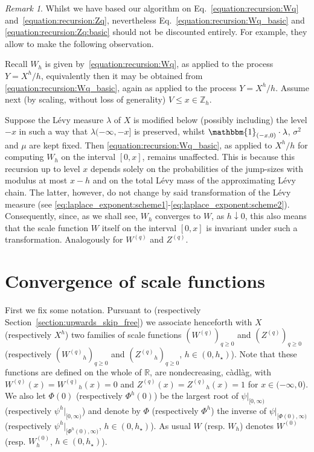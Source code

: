 \documentclass[pdftex,oneside,11pt,reqno]{amsart}
\theoremstyle{definition}
\theoremstyle{theorem}
\theoremstyle{remark}
\newtheorem{remark}{Remark}[section]
\numberwithin{equation}{section}
\numberwithin{definition}{section}
\begin{document}
\begin{remark}\label{remark:numerics:three} 
Whilst we have based our algorithm on Eq.~\eqref{equation:recursion:Wq} and~\eqref{equation:recursion:Zq}, nevertheless Eq.~\eqref{equation:recursion:Wq_basic} and \eqref{equation:recursion:Zq:basic} should not be discounted entirely. For example, they allow 
to make the following observation. 

Recall ${W}_h$ is given by~\eqref{equation:recursion:Wq}, as applied to the process $Y=X^h/h$, equivalently then it may be obtained from \eqref{equation:recursion:Wq_basic}, again as applied to the process $Y=X^h/h$. Assume next (by scaling, without loss of generality) $V\leq x\in {\mathbb{Z}_h}$. 

Suppose the L\'evy measure ${\lambda}$ of $X$ is modified below (possibly including) the level $-x$ in such a way that ${\lambda}(-\infty,-x]$ is preserved, whilst $ \mathbbm{1}_{(-x,0)}\cdot{\lambda}$, ${\sigma^2}$ and $\mu$ are kept fixed. Then \eqref{equation:recursion:Wq_basic}, as applied to $X^h/h$ for computing $W_h$ on the interval $[0,x]$, remains unaffected. This is because this recursion up to level $x$ depends solely on the probabilities of the jump-sizes with modulus at most $x-h$  and on the total L\'evy mass of the approximating L\'evy chain. The latter, however, do not change by said transformation of the L\'evy measure (see \eqref{eq:laplace_exponent:scheme1}-\eqref{eq:laplace_exponent:scheme2}). Consequently, since, as we shall see, ${W}_h$ converges to ${W}$, as $h\downarrow 0$, this also means that  the scale function ${W}$ itself on the interval $[0,x]$ is invariant under such a transformation. Analogously for ${W^{(q)}}$ and ${Z^{(q)}}$. 

\end{remark}

\section{Convergence of scale functions}\label{section:Convergence_of_scale_functions}
First we fix some notation. Pursuant to \cite[Subsections 8.1 \& 8.2]{kyprianou} (respectively Section~\ref{section:upwards_skip_free}) we associate henceforth with $X$ (respectively $X^h$) two families of scale functions $({W^{(q)}})_{q\geq 0}$ and $({Z^{(q)}})_{q\geq 0}$ (respectively  $({W^{(q)}}_h)_{q\geq 0}$ and $({Z^{(q)}}_h)_{q\geq 0}$, $h\in (0,h_\star)$). Note that these functions are defined on the whole of $\mathbb{R}$, are nondecreasing, c\`adl\`ag, with ${W^{(q)}}(x)={W^{(q)}}_h(x)=0$ and ${Z^{(q)}}(x)={Z^{(q)}}_h(x)=1$ for $x\in (-\infty,0$). We also let $\Phi(0)$ (respectively $\Phi^h(0)$) be the largest root of $\psi\vert_{[0,\infty)}$ (respectively $\psi^h\vert_{[0,\infty)}$) and denote by $\Phi$ (respectively $\Phi^h$) the inverse of $\psi\vert_{[\Phi(0),\infty)}$ (respectively $\psi^h\vert_{[\Phi^h(0),\infty)}$, $h\in (0,h_\star)$). As usual ${W}$ (resp. ${W}_h$) denotes ${W}^{(0)}$ (resp. ${W}^{(0)}_h$, $h\in (0,h_\star)$). 
\end{document}
